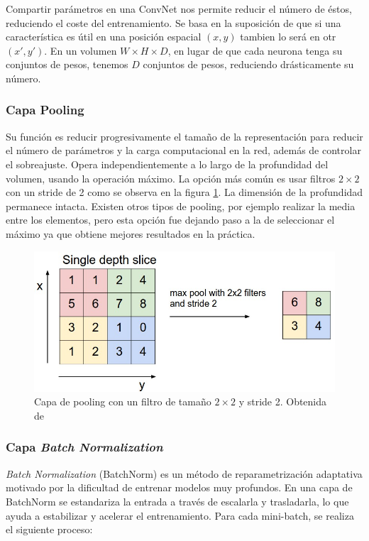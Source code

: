 Compartir parámetros en una ConvNet nos permite reducir el número de éstos, reduciendo el coste del entrenamiento. Se basa en la suposición de que si una característica es útil en una posición espacial $(x,y)$ tambien lo será en otr $(x',y')$. En un volumen $W \times H \times D$, en lugar de que cada neurona tenga su conjuntos de pesos, tenemos $D$ conjuntos de pesos, reduciendo drásticamente su número. 

\subsubsection{Capa Pooling}

Su función es reducir progresivamente el tamaño de la representación para reducir el número de parámetros y la carga computacional en la red, además de controlar el sobreajuste. Opera independientemente a lo largo de la profundidad del volumen, usando la operación máximo. La opción más común es usar filtros $2 \times 2$ con un stride de 2 como se observa en la figura \ref{fig:pooling}. La dimensión de la profundidad permanece intacta. Existen otros tipos de pooling, por ejemplo realizar la media entre los elementos, pero esta opción fue dejando paso a la de seleccionar el máximo ya que obtiene mejores resultados en la práctica.

\begin{figure}
    \centering
    \includegraphics[width=0.75\linewidth]{Plantilla_TFG_latex//imagenes//Inf//2.Fund/maxpool.jpeg}
    \caption{Capa de pooling con un filtro de tamaño $2 \times 2$ y stride 2. Obtenida de \cite{stanford_231}}
    \label{fig:pooling}
\end{figure}

\subsubsection{Capa \textit{Batch Normalization}}

\textit{Batch Normalization} (BatchNorm) \cite{batchnorm} es un método de reparametrización adaptativa motivado por la dificultad de entrenar modelos muy profundos. En una capa de BatchNorm se estandariza la entrada a través de escalarla y trasladarla, lo que ayuda a estabilizar y acelerar el entrenamiento. Para cada mini-batch, se realiza el siguiente proceso:

